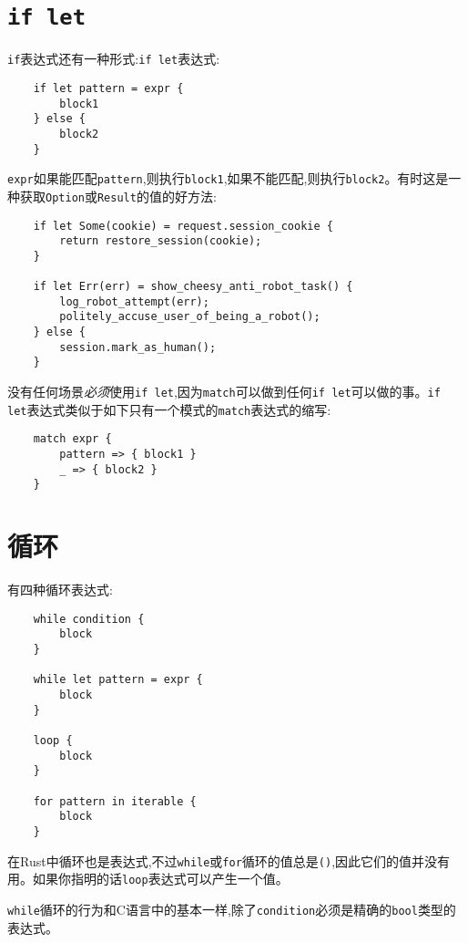 \section{\texttt{if let}}\label{iflet}

\texttt{if}表达式还有一种形式:\texttt{if let}表达式:
\begin{verbatim}
    if let pattern = expr {
        block1
    } else {
        block2
    }
\end{verbatim}

\texttt{expr}如果能匹配\texttt{pattern},则执行\texttt{block1},如果不能匹配,则执行\texttt{block2}。有时这是一种获取\texttt{Option}或\texttt{Result}的值的好方法:
\begin{verbatim}
    if let Some(cookie) = request.session_cookie {
        return restore_session(cookie);
    }

    if let Err(err) = show_cheesy_anti_robot_task() {
        log_robot_attempt(err);
        politely_accuse_user_of_being_a_robot();
    } else {
        session.mark_as_human();
    }
\end{verbatim}

没有任何场景\emph{必须}使用\texttt{if let},因为\texttt{match}可以做到任何\texttt{if let}可以做的事。\texttt{if let}表达式类似于如下只有一个模式的\texttt{match}表达式的缩写:
\begin{verbatim}
    match expr {
        pattern => { block1 }
        _ => { block2 }
    }
\end{verbatim}

\section{循环}\label{loop}

有四种循环表达式:
\begin{verbatim}
    while condition {
        block
    }
    
    while let pattern = expr {
        block
    }

    loop {
        block
    }

    for pattern in iterable {
        block
    }
\end{verbatim}

在Rust中循环也是表达式,不过\texttt{while}或\texttt{for}循环的值总是\texttt{()},因此它们的值并没有用。如果你指明的话\texttt{loop}表达式可以产生一个值。

\texttt{while}循环的行为和C语言中的基本一样,除了\texttt{condition}必须是精确的\texttt{bool}类型的表达式。

